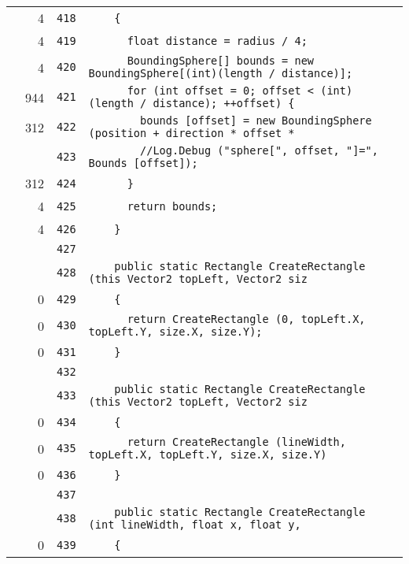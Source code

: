 \documentclass[a4paper,10pt]{article}
\begin{document}
\begin{longtable}[l]{lrrl}
\cellcolor{green} & 4 & \verb~418~ & \verb~    {~\\
\cellcolor{green} & 4 & \verb~419~ & \verb~      float distance = radius / 4;~\\
\cellcolor{green} & 4 & \verb~420~ & \verb~      BoundingSphere[] bounds = new BoundingSphere[(int)(length / distance)];~\\
\cellcolor{green} & 944 & \verb~421~ & \verb~      for (int offset = 0; offset < (int)(length / distance); ++offset) {~\\
\cellcolor{green} & 312 & \verb~422~ & \verb~        bounds [offset] = new BoundingSphere (position + direction * offset * ~\\
\cellcolor{gray} &  & \verb~423~ & \verb~        //Log.Debug ("sphere[", offset, "]=", Bounds [offset]);~\\
\cellcolor{green} & 312 & \verb~424~ & \verb~      }~\\
\cellcolor{green} & 4 & \verb~425~ & \verb~      return bounds;~\\
\cellcolor{green} & 4 & \verb~426~ & \verb~    }~\\
\cellcolor{gray} &  & \verb~427~ & \verb~~\\
\cellcolor{gray} &  & \verb~428~ & \verb~    public static Rectangle CreateRectangle (this Vector2 topLeft, Vector2 siz~\\
\cellcolor{red} & 0 & \verb~429~ & \verb~    {~\\
\cellcolor{red} & 0 & \verb~430~ & \verb~      return CreateRectangle (0, topLeft.X, topLeft.Y, size.X, size.Y);~\\
\cellcolor{red} & 0 & \verb~431~ & \verb~    }~\\
\cellcolor{gray} &  & \verb~432~ & \verb~~\\
\cellcolor{gray} &  & \verb~433~ & \verb~    public static Rectangle CreateRectangle (this Vector2 topLeft, Vector2 siz~\\
\cellcolor{red} & 0 & \verb~434~ & \verb~    {~\\
\cellcolor{red} & 0 & \verb~435~ & \verb~      return CreateRectangle (lineWidth, topLeft.X, topLeft.Y, size.X, size.Y)~\\
\cellcolor{red} & 0 & \verb~436~ & \verb~    }~\\
\cellcolor{gray} &  & \verb~437~ & \verb~~\\
\cellcolor{gray} &  & \verb~438~ & \verb~    public static Rectangle CreateRectangle (int lineWidth, float x, float y, ~\\
\cellcolor{red} & 0 & \verb~439~ & \verb~    {~\\

\end{longtable}
\end{document}
